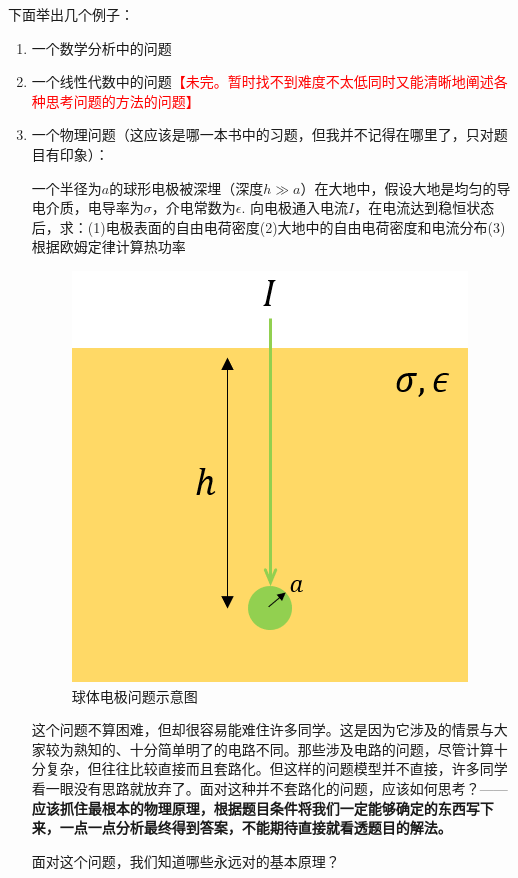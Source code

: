 \documentclass{ctexart}
\begin{document}
\begin{myexample}
  下面举出几个例子：
  \begin{enumerate}[leftmargin=*, labelsep=0.5em]
    \item 一个数学分析中的问题
    \item 一个线性代数中的问题\textcolor{red}{【未完。暂时找不到难度不太低同时又能清晰地阐述各种思考问题的方法的问题】}
    \item 一个物理问题（这应该是哪一本书中的习题，但我并不记得在哪里了，只对题目有印象）：
    
    一个半径为$a$的球形电极被深埋（深度$h \gg a$）在大地中，假设大地是均匀的导电介质，电导率为$\sigma$，介电常数为$\epsilon$.
    向电极通入电流$I$，在电流达到稳恒状态后，求：(1)电极表面的自由电荷密度(2)大地中的自由电荷密度和电流分布(3)根据欧姆定律计算热功率
    
    \begin{figure}[H]
      \centering
      \includegraphics[width=.25\linewidth]{fig/大地电流.png}
      \caption{球体电极问题示意图}
      \label{fig:electrode}
    \end{figure}
    
    这个问题不算困难，但却很容易能难住许多同学。这是因为它涉及的情景与大家较为熟知的、十分简单明了的电路不同。那些涉及电路的问题，尽管计算十分复杂，但往往比较直接而且套路化。但这样的问题模型并不直接，许多同学看一眼没有思路就放弃了。面对这种并不套路化的问题，应该如何思考？——\textbf{应该抓住最根本的物理原理，根据题目条件将我们一定能够确定的东西写下来，一点一点分析最终得到答案，不能期待直接就看透题目的解法。}
    
    面对这个问题，我们知道哪些永远对的基本原理？
    

\end{enumerate}
\end{myexample}
\end{document}
